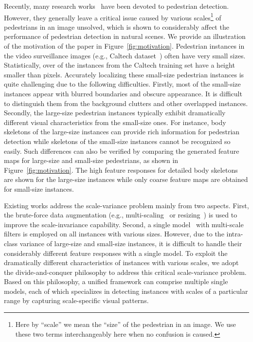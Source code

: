 \documentclass[journal]{IEEEtran}
\begin{document}
Recently, many research works~\cite{ta_cnn,compact,ouyang2013joint,sermanet2013pedestrian} have been devoted to pedestrian detection. However, they generally leave a critical issue caused by various scales\footnote{Here by ``scale'' we mean the ``size'' of the pedestrian in an image. We  use these two terms interchangeably here when no confusion is caused.} of pedestrians in an image unsolved, which is shown to considerably affect the performance of pedestrian detection in natural scenes. We provide an illustration of the motivation of the paper in Figure~\ref{fig:motivation}. Pedestrian instances in the video surveillance images (e.g., Caltech dataset~\cite{dollar2012pedestrian}) often have very small sizes. Statistically, over  of the instances from the Caltech training set have a height smaller than  pixels. Accurately localizing these small-size pedestrian instances is quite challenging due to the following difficulties. Firstly, most of the small-size instances appear with blurred boundaries and obscure appearance. It is difficult to distinguish them from the background clutters and other overlapped instances. Secondly, the large-size pedestrian instances typically exhibit dramatically different visual characteristics from the small-size ones. For instance, body skeletons of the large-size instances can provide rich information for pedestrian detection  while  skeletons of the small-size instances cannot be recognized so easily.  
Such differences can also be verified by comparing the generated feature maps for large-size and small-size pedestrians, as shown in Figure~\ref{fig:motivation}. The high feature responses for detailed body skeletons are shown for the large-size instances while only coarse feature maps are obtained for small-size instances. 

Existing works address the scale-variance problem mainly from two aspects. First, the brute-force data augmentation (e.g., multi-scaling~\cite{girshick2015fast} or resizing~\cite{girshick2014rich}) is used to improve the scale-invariance capability.  
Second, a single model~\cite{gong2014multi}\cite{xu2014scale} with multi-scale filters is employed on all instances with various sizes. However, due to the intra-class variance of large-size and small-size instances, it is difficult to handle their considerably different feature responses with a single model.  To exploit the dramatically different characteristics of instances with various scales, we adopt the divide-and-conquer philosophy to address this critical scale-variance problem. Based on this philosophy, a unified framework can comprise multiple single models, each of which specializes in detecting instances with scales of a particular range by capturing scale-specific visual patterns. 
\end{document}
